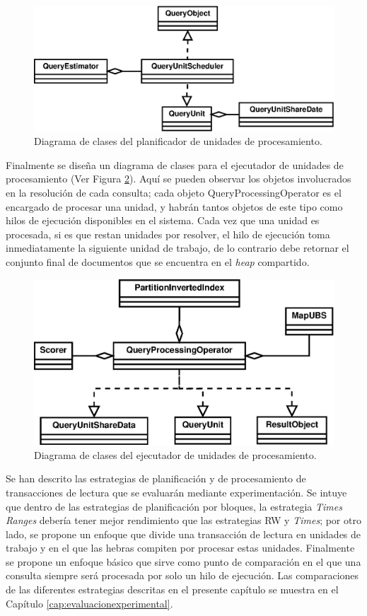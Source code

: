 \begin{figure}[tp]
\centering
\includegraphics[scale=.75]{images/QueryUnitScheduler.eps}
\caption{Diagrama de clases del planificador de unidades de procesamiento.}
\label{fig:queryunit_scheduler}
\end{figure}


Finalmente se diseña un diagrama de clases para el ejecutador de unidades de procesamiento (Ver Figura \ref{fig:queryunit_executer}). Aquí se pueden observar los objetos involucrados en la resolución de cada consulta; cada objeto QueryProcessingOperator es el encargado de procesar una unidad, y habrán tantos objetos de este tipo como hilos de ejecución disponibles en el sistema. Cada vez que una unidad es procesada, si es que restan unidades por resolver, el hilo de ejecución toma inmediatamente la siguiente unidad de trabajo, de lo contrario debe retornar el conjunto final de documentos que se encuentra en el \textit{heap} compartido. 

\begin{figure}[tp]
\centering
\includegraphics[scale=.75]{images/QueryUnitExecuter.eps}
\caption{Diagrama de clases del ejecutador de unidades de procesamiento.}
\label{fig:queryunit_executer}
\end{figure}


Se han descrito las estrategias de planificación y de procesamiento de transacciones de lectura que se evaluarán mediante experimentación. Se intuye que dentro de las estrategias de planificación por bloques, la estrategia \textit{Times Ranges} debería tener mejor rendimiento que las estrategias RW y \textit{Times}; por otro lado, se propone un enfoque que divide una transacción de lectura en unidades de trabajo y en el que las hebras compiten por procesar estas unidades. Finalmente se propone un enfoque básico que sirve como punto de comparación en el que una consulta siempre será procesada por solo un hilo de ejecución. Las comparaciones de las diferentes estrategias descritas en el presente capítulo se muestra en el Capítulo \ref{cap:evaluacionexperimental}.